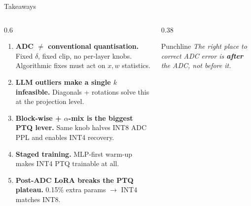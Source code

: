 \begin{frame}[shrink=25]{Takeaways}

  \begin{columns}[T]
    \begin{column}{0.6\textwidth}
      \footnotesize
      \begin{enumerate}
        \setlength\itemsep{0.4em}
        \item \textbf{ADC $\ne$ conventional quantisation.} Fixed $\delta$, fixed clip, no per-layer knobs. Algorithmic fixes must act on $x,w$ statistics.
        \item \textbf{LLM outliers make a single $k$ infeasible.} Diagonals + rotations solve this at the projection level.
        \item \textbf{Block-wise + $\alpha$-mix is the biggest PTQ lever.} Same knob halves INT8 ADC PPL and enables INT4 recovery.
        \item \textbf{Staged training.} MLP-first warm-up makes INT4 PTQ trainable at all.
        \item \textbf{Post-ADC LoRA breaks the PTQ plateau.} 0.15\% extra params $\to$ INT4 matches INT8.
      \end{enumerate}
    \end{column}

    \begin{column}{0.38\textwidth}
      \footnotesize
      \begin{center}
      \end{center}

      \vspace{0.3em}
      \begin{alertblock}{Punchline}
        \small\emph{The right place to correct ADC error is \textbf{after} the ADC, not before it.}
      \end{alertblock}
    \end{column}
  \end{columns}
\end{frame}
